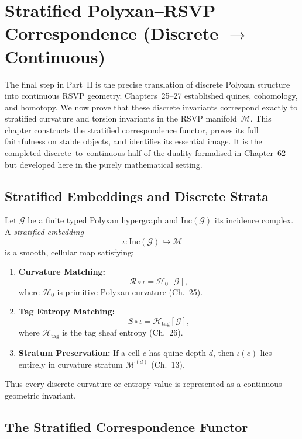 \chapter{Stratified Polyxan--RSVP Correspondence (Discrete $\to$ Continuous)}
\label{chap:28}

The final step in Part~II is the precise translation of discrete Polyxan
structure into continuous RSVP geometry.  
Chapters~25--27 established quines, cohomology, and homotopy.
We now prove that these discrete invariants correspond exactly to
stratified curvature and torsion invariants in the RSVP manifold~$\mathcal{M}$.
This chapter constructs the stratified correspondence functor,
proves its full faithfulness on stable objects,
and identifies its essential image.
It is the completed discrete--to--continuous half of the duality
formalised in Chapter~62 but developed here in the purely mathematical setting.

\section{Stratified Embeddings and Discrete Strata}

Let $\mathcal{G}$ be a finite typed Polyxan hypergraph
and $\mathrm{Inc}(\mathcal{G})$ its incidence complex.
A \emph{stratified embedding}
\[
\iota : \mathrm{Inc}(\mathcal{G}) \hookrightarrow \mathcal{M}
\]
is a smooth, cellular map satisfying:

\begin{enumerate}
\item \textbf{Curvature Matching:}
\[
\mathcal{R}\circ\iota = \mathcal{H}_0[\mathcal{G}],
\]
where $\mathcal{H}_0$ is primitive Polyxan curvature (Ch.~25).

\item \textbf{Tag Entropy Matching:}
\[
S\circ\iota = \mathcal{H}_{\mathrm{tag}}[\mathcal{G}],
\]
where $\mathcal{H}_{\mathrm{tag}}$ is the tag sheaf entropy (Ch.~26).

\item \textbf{Stratum Preservation:}
If a cell $c$ has quine depth $d$,  
then $\iota(c)$ lies entirely in curvature stratum $\mathcal{M}^{(d)}$
(Ch.~13).
\end{enumerate}

Thus every discrete curvature or entropy value is represented
as a continuous geometric invariant.

\section{The Stratified Correspondence Functor}

